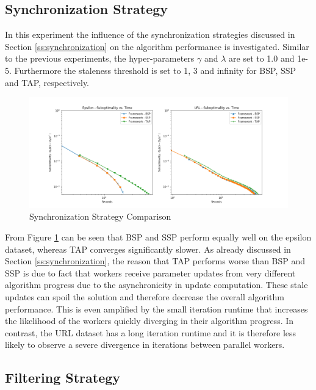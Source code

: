 \subsection{Synchronization Strategy}
In this experiment the influence of the synchronization strategies discussed in Section \ref{ss:synchronization} on the algorithm performance is investigated.
Similar to the previous experiments, the hyper-parameters $\gamma$ and $\lambda$ are set to 1.0 and 1e-5.
Furthermore the staleness threshold is set to 1, 3 and infinity for BSP, SSP and TAP, respectively.
\begin{figure}[ht]
\centering
\includegraphics[width=1.0\textwidth]{img/sync_strat_cmp.png}
\caption{Synchronization Strategy Comparison}
\label{fig:sync_strat_cmp}
\end{figure}
From Figure \ref{fig:sync_strat_cmp} can be seen that BSP and SSP perform equally well on the epsilon dataset, whereas TAP converges significantly slower.
As already discussed in Section \ref{ss:synchronization}, the reason that TAP performs worse than BSP and SSP is due to fact that workers receive parameter updates from very different algorithm progress due to the asynchronicity in update computation.
These stale updates can spoil the solution and therefore decrease the overall algorithm performance.
This is even amplified by the small iteration runtime that increases the likelihood of the workers quickly diverging in their algorithm progress.
In contrast, the URL dataset has a long iteration runtime and it is therefore less likely to observe a severe divergence in iterations between parallel workers.

\subsection{Filtering Strategy}
\label{ss:filtering_strategy}

